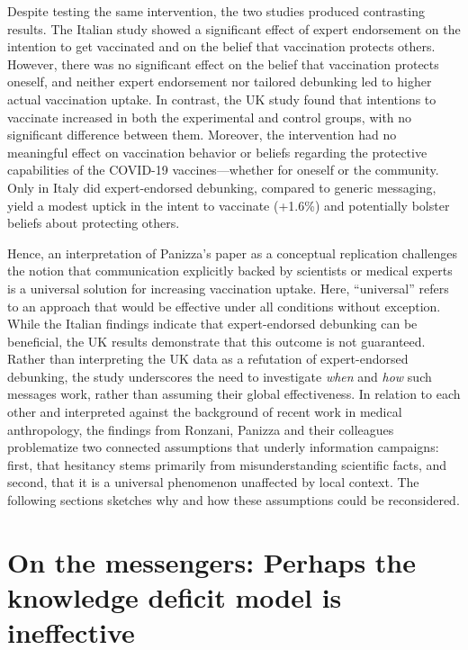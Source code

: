 \documentclass[authordate, empirical]{jote-new-article}
\begin{document}
	Despite testing the same intervention, the two studies produced contrasting results. The Italian study showed a significant effect of expert endorsement on the intention to get vaccinated and on the belief that vaccination protects others. However, there was no significant effect on the belief that vaccination protects oneself, and neither expert endorsement nor tailored debunking led to higher actual vaccination uptake. In contrast, the UK study found that intentions to vaccinate increased in both the experimental and control groups, with no significant difference between them. Moreover, the intervention had no meaningful effect on vaccination behavior or beliefs regarding the protective capabilities of the COVID-19 vaccines—whether for oneself or the community. Only in Italy did expert-endorsed debunking, compared to generic messaging, yield a modest uptick in the intent to vaccinate (+1.6\%) and potentially bolster beliefs about protecting others.







	Hence, an interpretation of Panizza's paper as a conceptual replication challenges the notion that communication explicitly backed by scientists or medical experts is a universal solution for increasing vaccination uptake. Here, “universal” refers to an approach that would be effective under all conditions without exception. While the Italian findings indicate that expert-endorsed debunking can be beneficial, the UK results demonstrate that this outcome is not guaranteed. Rather than interpreting the UK data as a refutation of expert-endorsed debunking, the study underscores the need to investigate \emph{when} and \emph{how} such messages work, rather than assuming their global effectiveness. In relation to each other and interpreted against the background of recent work in medical anthropology, the findings from Ronzani, Panizza and their colleagues problematize two connected assumptions that underly information campaigns: first, that hesitancy stems primarily from misunderstanding scientific facts, and second, that it is a universal phenomenon unaffected by local context. The following sections sketches why and how these assumptions could be reconsidered.



	\section{On the messengers: Perhaps the knowledge deficit model is ineffective}
\end{document}

